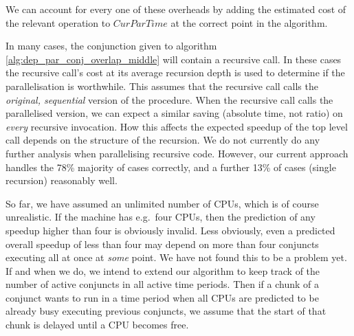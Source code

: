 {\noindent
We can account for every one of these overheads
by adding the estimated cost of the relevant operation to $CurParTime$
at the correct point in the algorithm.

In many cases,
the conjunction given to algorithm \ref{alg:dep_par_conj_overlap_middle}
will contain a recursive call.
In these cases the recursive call's cost at its average recursion depth is
used to determine if the parallelisation is worthwhile.
This assumes that the recursive call
calls the \emph{original, sequential} version of the procedure.
When the recursive call calls the parallelised version,
we can expect a similar saving (absolute time, not ratio)
on \emph{every} recursive invocation.
How this affects the expected speedup of the top level call
depends on the structure of the recursion.
We do not currently do any further analysis when parallelising recursive
code.
However, our current approach handles the 78\% majority of cases correctly,
and a further 13\% of cases (single recursion) reasonably well.

So far, we have assumed an unlimited number of CPUs,
which is of course unrealistic.
If the machine has e.g.\ four CPUs,
then the prediction of any speedup higher than four is obviously invalid.
Less obviously,
even a predicted overall speedup of less than four may depend
on more than four conjuncts executing all at once at \emph{some} point.
We have not found this to be a problem yet.
If and when we do,
we intend to extend our algorithm to keep track
of the number of active conjuncts in all active time periods.
Then if a chunk of a conjunct wants to run in a time period
when all CPUs are predicted to be already busy executing previous conjuncts,
we assume that the start of that chunk is delayed until a CPU becomes free.

}
